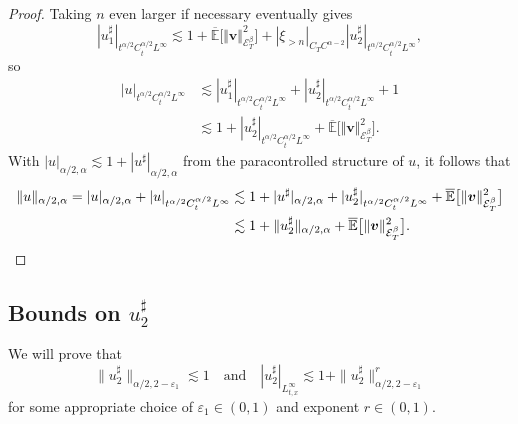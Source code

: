 \documentclass[10pt]{amsart}
\theoremstyle{definition}
\let\epsilon\varepsilon
\newcommand\bbE{\mathbb{E}}
\newcommand{\mcE}{\mathcal{E}}
\newcommand{\bsv}{\boldsymbol{v}}
\newcommand{\norme}[1]{\Vert #1 \Vert}
\begin{document}
\begin{proof}
Taking $n$ even larger if necessary eventually gives
\[
| u_1^{\sharp} |_{t^{\alpha / 2} C^{\alpha / 2}_t L^{\infty}} \lesssim 1 + \overline{\bbE}\bigl[\norme{\bsv}^2_{\mcE^\beta_T}\bigr] +
| \xi_{> n} |_{C_T C^{\alpha - 2}} | u_2^{\sharp} |_{t^{\alpha / 2}
C^{\alpha / 2}_t L^{\infty}},
\]
so
\begin{equation}
\begin{aligned}
| u |_{t^{\alpha / 2} C^{\alpha / 2}_t L^{\infty}} &\lesssim | u_1^{\sharp}
|_{t^{\alpha / 2} C^{\alpha / 2}_t L^{\infty}} + | u_2^{\sharp} |_{t^{\alpha
/ 2} C^{\alpha / 2}_t L^{\infty}} + 1\\
&\lesssim 1 + | u_2^{\sharp}
|_{t^{\alpha / 2} C^{\alpha / 2}_t L^{\infty}} +\overline{\bbE}\bigl[\norme{\bsv}^2_{\mcE^\beta_T}\bigr].
\end{aligned}
\end{equation}
With $| u |_{\alpha / 2, \alpha} \lesssim 1 + |
u^{\sharp} |_{\alpha / 2, \alpha}$ from the paracontrolled structure of $u$,
it follows that
\begin{align*} \| u \|_{\alpha / 2, \alpha} = | u |_{\alpha / 2, \alpha} + | u
|_{t^{\alpha / 2} C^{\alpha / 2}_t L^{\infty}} &\lesssim 1 + | u^{\sharp}
|_{\alpha / 2, \alpha} + | u_2^{\sharp} |_{t^{\alpha / 2} C^{\alpha / 2}_t
L^{\infty}} + \overline{\bbE}\bigl[\norme{\bsv}^2_{\mcE^\beta_T}\bigr]
\\
&\lesssim 1 + \| u_2^{\sharp} \|_{\alpha / 2, \alpha} + \overline{\bbE}\bigl[\norme{\bsv}^2_{\mcE^\beta_T}\bigr].\qedhere
\end{align*}
\end{proof}

\subsection{Bounds on $u_2^{\sharp}$}

We will prove that
\[
\| u_2^{\sharp} \|_{\alpha / 2, 2 - \epsilon_1} \lesssim 1\quad\text{and}\quad | u_2^{\sharp} |_{L^{\infty}_{t, x}} \lesssim 1 + \| u_2^{\sharp} \|^r_{\alpha / 2, 2 - \epsilon_1}
\]
for some appropriate choice of $\epsilon_1\in(0,1)$ and exponent $r\in(0,1)$.
\end{document}
